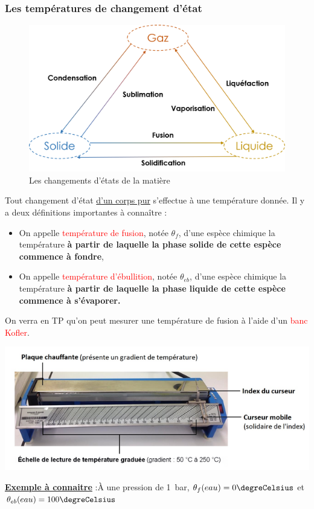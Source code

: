 \subsubsection{Les températures de changement d'état}
\begin{figure}[!htb]
    \centering
    \includegraphics[scale=0.5]{Images/Chapitre_1/Changement_etat_complet.png}
    \caption{Les changements d'états de la matière}
    \label{fig:enter-label}
\end{figure}
Tout changement d'état \underline{d'un corps pur} s'effectue à une température donnée. Il y a deux définitions importantes à connaître :
\begin{itemize}
    \item On appelle \textcolor{red}{température de fusion}, notée $\theta_f$, d'une espèce chimique la température \textbf{à partir de laquelle la phase solide de cette espèce commence à fondre},
    \item On appelle \textcolor{red}{température d'ébullition}, notée $\theta_{eb}$, d'une espèce chimique la température \textbf{à partir de laquelle la phase liquide de cette espèce commence à s'évaporer.} 
\end{itemize}
On verra en TP qu'on peut mesurer une température de fusion à l'aide d'un \textcolor{red}{banc Kofler}.

\begin{minipage}{0.6\textwidth}
\includegraphics[width=1\textwidth]{Images/Chapitre_1/Banc_Kofler.png} 
  \end{minipage}
\begin{minipage}{0.4\textwidth}
\underline{\textbf{Exemple à connaitre}} :\newline \`{A} une pression de 1~bar, $\theta_{f}(eau)=0\degreCelsius$ et $\theta_{eb}(eau)=100\degreCelsius$
  \end{minipage}



